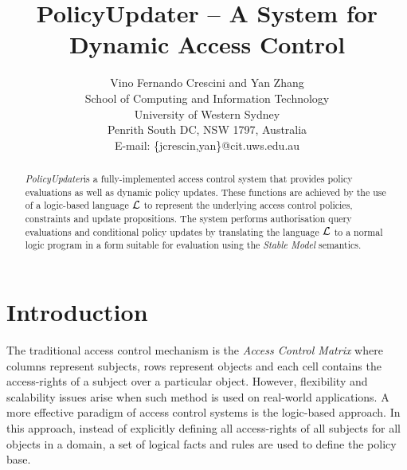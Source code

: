 \documentclass[11pt, twocolumn]{article}
\begin{document}
  \title{PolicyUpdater -- A System for Dynamic Access Control}
  \author{
    Vino Fernando Crescini and Yan Zhang                   \\
    School of Computing and Information Technology         \\
    University of Western Sydney                           \\
    Penrith South DC, NSW 1797, Australia                  \\
    E-mail: \{jcrescin,yan\}@cit.uws.edu.au
  }

  \date{}

  \maketitle

  \begin{abstract}
    {\em PolicyUpdater}\footnotemark is a fully-implemented access control
    system that provides policy evaluations as well as dynamic policy updates.
    These functions are achieved by the use of a logic-based language
    ${\cal L}$ to represent the underlying access control policies, constraints
    and update propositions. The system performs authorisation query
    evaluations and conditional policy updates by translating the language
    $\cal{L}$ to a normal logic program in a form suitable for evaluation using
    the {\em Stable Model} semantics.
  \end{abstract}


  \section{Introduction}

    The traditional access control mechanism is the {\em Access Control Matrix}
    where columns represent subjects, rows represent objects and each cell
    contains the access-rights of a subject over a particular object. However,
    flexibility and scalability issues arise when such method is used on
    real-world applications. A more effective paradigm of access control
    systems is the logic-based approach. In this approach, instead of
    explicitly defining all access-rights of all subjects for all objects
    in a domain, a set of logical facts and rules are used to define the
    policy base.
\end{document}
